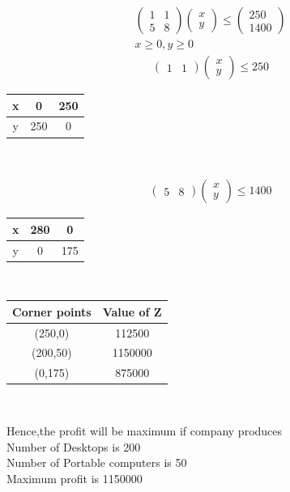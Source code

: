 \documentclass[10pt, a4paper]{article}
\newcommand{\myvec}[1]{\ensuremath{\begin{pmatrix}#1\end{pmatrix}}}
\begin{document}
\begin{align}
 \myvec{1&1\\5&8}\myvec{x\\y} \le \myvec{250\\1400} \\
 x \geq 0,y \geq 0
\end{align}
\begin{align}
 \myvec{1&1}\myvec{x\\y} \le 250 
\end{align}
\begin{center}
\begin{tabular}{|c|c|c|}
	\hline
	x&0&250\\
	\hline
	y&250&0\\
	\hline
\end{tabular}\\
\end{center}
\begin{align}
 \myvec{5&8}\myvec{x\\y} \le 1400 
\end{align}
\begin{center}
\begin{tabular}{|c|c|c|}
	\hline
	x&280&0\\
	\hline
	y&0&175\\
	\hline
\end{tabular}\\
\end{center}
\begin{center}
\begin{tabular}{|c|c|}
	\hline
	\textbf{Corner points}&\textbf{Value of Z}\\
	\hline
	(250,0)&112500\\
    \hline
	(200,50)&1150000\\
	\hline
	(0,175)&875000\\
	\hline
\end{tabular}\\
\end{center}
\begin{center}
Hence,the profit will be maximum if company produces\\
	Number of Desktops is 200\\
	Number of Portable computers is 50\\
	Maximum profit is 1150000\\
\end{center}
\end{document}
